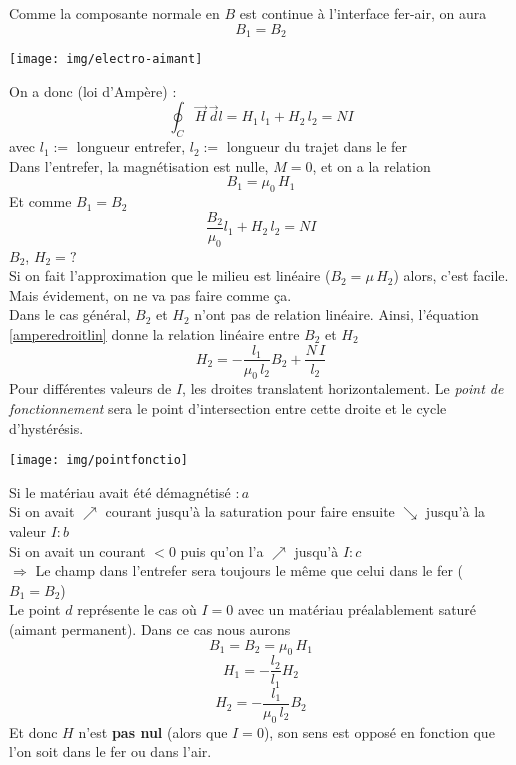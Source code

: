 \documentclass	[11pt, a4paper, openany]{book}
\begin{document}
Comme la composante normale en $B$ est continue à l'interface fer-air, on aura 
\begin{equation}
B_1=B_2
\end{equation}
\begin{center}
\texttt{[image: img/electro-aimant]}
\end{center}
On a donc (loi d'Ampère) : \begin{equation}
\oint_C\vec H\,\vec dl=H_1\,l_1+H_2\,l_2=NI
\end{equation}
avec $l_1:=$ longueur entrefer, $l_2:=$ longueur du trajet dans le fer\\
Dans l'entrefer, la magnétisation est nulle, $M=0$, et on a la relation \begin{equation}
B_1=\mu_0\,H_1
\end{equation}\label{amperedroitlin}
Et comme $B_1=B_2$\begin{equation}
\frac{B_2}{\mu_0}l_1+H_2\,l_2=NI
\end{equation}
$B_2$, $H_2=?$\\
Si on fait l'approximation que le milieu est linéaire ($B_2=\mu\,H_2$) alors, c'est facile. Mais évidement, on ne va pas faire comme ça.\\
Dans le cas général, $B_2$ et $H_2$ n'ont pas de relation linéaire. Ainsi, l'équation \eqref{amperedroitlin} donne la relation linéaire entre $B_2$ et $H_2$ \begin{equation}
H_2=-\frac{l_1}{\mu_0\,l_2}B_2+\frac{N\,I}{l_2}
\end{equation}
Pour différentes valeurs de $I$, les droites translatent horizontalement. Le \textit{point de fonctionnement} sera le point d'intersection entre cette droite et le cycle d'hystérésis.
\begin{center}
\texttt{[image: img/pointfonctio]}
\end{center}
Si le matériau avait été démagnétisé $:a$\\ Si on avait $\nearrow$ courant jusqu'à la saturation pour faire ensuite $\searrow$ jusqu'à la valeur $I:b$ \\Si on avait un courant $<0$ puis qu'on l'a $\nearrow$ jusqu'à $I: c$\\ 
$\Rightarrow$ Le champ dans l'entrefer sera toujours le même que celui dans le fer ($B_1=B_2$)\\

Le point $d$ représente le cas où $I=0$ avec un matériau préalablement saturé (aimant permanent). Dans ce cas nous aurons $$B_1=B_2=\mu_0\,H_1$$\begin{equation}
H_1=-\frac{l_2}{l_1}H_2
\end{equation}
$$H_2=-\frac{l_1}{\mu_0\,l_2}B_2$$ Et donc $H$ n'est \textbf{pas nul} (alors que $I=0$), son sens est opposé en fonction que l'on soit dans le fer ou dans l'air.
\end{document}
